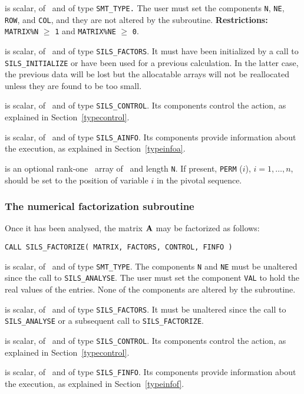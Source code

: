 \documentclass{galahad}
\newcommand{\packagename}{SILS}
\begin{document}
\begin{description}
 is scalar, of \intentin\ and of type 
{\tt SMT\_TYPE.}  
The user must set the components {\tt N}, {\tt NE}, {\tt ROW}, 
and {\tt COL}, and they are not altered by the subroutine. 
 {\bf Restrictions:} 
 {\tt MATRIX\%N} $\geq$ {\tt 1} and {\tt MATRIX\%NE} $\geq$ {\tt 0}. 
  
 is scalar, of \intentinout\ and of type 
{\tt \packagename\_FACTORS}. It must have been initialized by a call to 
{\tt \packagename\_INI\-TIALIZE} or have been used for a previous calculation. 
In the latter case, the previous data will be lost but the allocatable 
arrays will not be reallocated unless they are found to be too small. 
 
 is scalar, of \intentin\ and of type 
{\tt \packagename\_CONTROL}. Its components control the action, as explained in 
Section~\ref{typecontrol}. 
 
 is scalar, of \intentout\ and of type {\tt \packagename\_AINFO}. 
Its components provide information about the execution, as explained in 
Section~\ref{typeinfoa}. 
 
 is an optional rank-one \integer\ array of \intentin\
and length {\tt N}.
If present, {\tt PERM} ($i$), $i = 1, \ldots, n$, should be set 
to the position of  variable $i$ in the pivotal sequence. 
  
\end{description}


\subsubsection{The numerical factorization subroutine}
Once it has been analysed, the matrix ${\mathbf{A}}$ may be factorized as follows:

\hskip0.5in 
{\tt CALL \packagename\_FACTORIZE( MATRIX, FACTORS, CONTROL, FINFO )}

\begin{description}

 is scalar, of \intentin\ and of type {\tt SMT\_TYPE}.  The 
components {\tt N} and {\tt NE} must be unaltered since the call 
to {\tt \packagename\_ANALYSE}. The user must set the component {\tt VAL} 
to hold the real values of the entries. None of the components are altered 
by the subroutine. 
 
 is scalar, of \intentinout\ and of type 
{\tt \packagename\_FACTORS}. It must be unaltered since the call 
to {\tt \packagename\_ANALYSE} or a subsequent call to 
{\tt \packagename\_FACTORIZE}. 
 
 is scalar, of \intentin\ and of type 
{\tt \packagename\_CONTROL}. Its components control the action, as explained in 
Section~\ref{typecontrol}. 
 
 is scalar, of \intentout\ and of type {\tt \packagename\_FINFO}. 
Its components provide information about the execution, as explained in 
Section~\ref{typeinfof}. 

\end{description}
\end{document}
